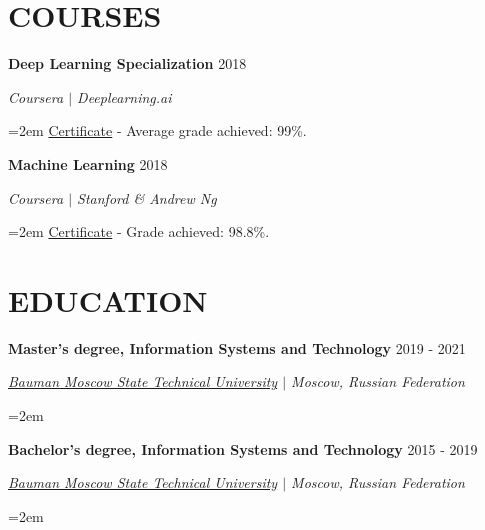 \documentclass{article}
\newcommand{\NewPart}[1]{\section*{{\color{gray}\uppercase{#1}}}}
\newcommand{\ExperienceEntry}[4]{
		\noindent \textbf{#1} \hfill  
		\hfill #2 \par  %
		\noindent \textit{#3} \par        %
		\noindent\hangindent=2em\hangafter=0 \small #4 %
		\normalsize \par}
\begin{document}
\NewPart{Courses}{}
\ExperienceEntry
{Deep Learning Specialization}
{2018}
{Coursera $\vert$ Deeplearning.ai}
{\href{https://www.coursera.org/account/accomplishments/specialization/V5P6NWX4CR95} {Certificate} - Average grade achieved: 99\%.}
\ExperienceEntry
{Machine Learning}
{2018}
{Coursera $\vert$ Stanford \& Andrew Ng}
{\href{https://www.coursera.org/account/accomplishments/certificate/W2FV6BT5XCPF} {Certificate} - Grade achieved: 98.8\%.}

\NewPart{Education}{}
\ExperienceEntry
{Master's degree, Information Systems and Technology}
{2019 - 2021}
{\href{http://bmstu.ru/en}{Bauman Moscow State Technical University} $\vert$ Moscow, Russian Federation}
{}
\ExperienceEntry
{Bachelor's degree, Information Systems and Technology}
{2015 - 2019}
{\href{http://bmstu.ru/en}{Bauman Moscow State Technical University} $\vert$ Moscow, Russian Federation}
{}
\end{document}
